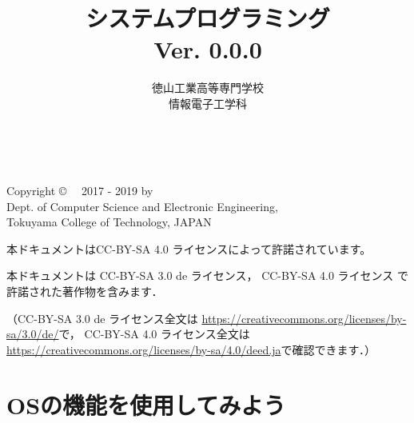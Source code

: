 \documentclass[a4paper,11pt,twocolumn]{ltjsbook}      %
\begin{document}
\frontmatter
\title{システムプログラミング\\Ver. 0.0.0}
\author{徳山工業高等専門学校\\情報電子工学科}
\date{}
\maketitle

\thispagestyle{empty}
\onecolumn
~
\vfill
\begin{flushleft}
Copyright \copyright ~~ 2017 - 2019 by \\
Dept. of Computer Science and Electronic Engineering, \\
Tokuyama College of Technology, JAPAN
\end{flushleft}

\vspace{0.8cm}
本ドキュメントはCC-BY-SA 4.0 ライセンスによって許諾されています。

本ドキュメントは
CC-BY-SA 3.0 de ライセンス，
CC-BY-SA 4.0 ライセンス
で許諾された著作物を含みます．

（CC-BY-SA 3.0 de ライセンス全文は
\url{https://creativecommons.org/licenses/by-sa/3.0/de/}で，
CC-BY-SA 4.0 ライセンス全文は
\url{https://creativecommons.org/licenses/by-sa/4.0/deed.ja}で確認できます．）

\setcounter{tocdepth}{2}
\tableofcontents

\mainmatter

\part{OSの機能を使用してみよう}
\setcounter{page}{23}               %
\end{document}
